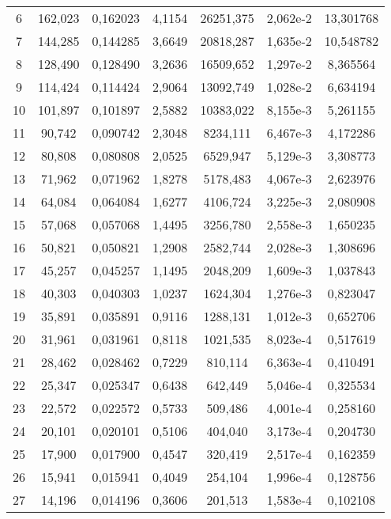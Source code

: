 \begin{longtable}{S[table-format=4.0]S[table-format=3.3]
                  S[table-format=2.6]S[table-format=2.4]
                  S[table-format=6.3]S[table-format=1.3e1]
                  S[table-format=3.6]}
 6 &    162,023 &   0,162023 &     4,1154 &  26251,375 &  2,062e-2 &  13,301768 \\
 7 &    144,285 &   0,144285 &     3,6649 &  20818,287 &  1,635e-2 &  10,548782 \\
 8 &    128,490 &   0,128490 &     3,2636 &  16509,652 &  1,297e-2 &   8,365564 \\
 9 &    114,424 &   0,114424 &     2,9064 &  13092,749 &  1,028e-2 &   6,634194 \\
10 &    101,897 &   0,101897 &     2,5882 &  10383,022 &  8,155e-3 &   5,261155 \\
11 &     90,742 &   0,090742 &     2,3048 &   8234,111 &  6,467e-3 &   4,172286 \\
12 &     80,808 &   0,080808 &     2,0525 &   6529,947 &  5,129e-3 &   3,308773 \\
13 &     71,962 &   0,071962 &     1,8278 &   5178,483 &  4,067e-3 &   2,623976 \\
14 &     64,084 &   0,064084 &     1,6277 &   4106,724 &  3,225e-3 &   2,080908 \\
15 &     57,068 &   0,057068 &     1,4495 &   3256,780 &  2,558e-3 &   1,650235 \\
16 &     50,821 &   0,050821 &     1,2908 &   2582,744 &  2,028e-3 &   1,308696 \\
17 &     45,257 &   0,045257 &     1,1495 &   2048,209 &  1,609e-3 &   1,037843 \\
18 &     40,303 &   0,040303 &     1,0237 &   1624,304 &  1,276e-3 &   0,823047 \\
19 &     35,891 &   0,035891 &     0,9116 &   1288,131 &  1,012e-3 &   0,652706 \\
20 &     31,961 &   0,031961 &     0,8118 &   1021,535 &  8,023e-4 &   0,517619 \\
21 &     28,462 &   0,028462 &     0,7229 &    810,114 &  6,363e-4 &   0,410491 \\
22 &     25,347 &   0,025347 &     0,6438 &    642,449 &  5,046e-4 &   0,325534 \\
23 &     22,572 &   0,022572 &     0,5733 &    509,486 &  4,001e-4 &   0,258160 \\
24 &     20,101 &   0,020101 &     0,5106 &    404,040 &  3,173e-4 &   0,204730 \\
25 &     17,900 &   0,017900 &     0,4547 &    320,419 &  2,517e-4 &   0,162359 \\
26 &     15,941 &   0,015941 &     0,4049 &    254,104 &  1,996e-4 &   0,128756 \\
27 &     14,196 &   0,014196 &     0,3606 &    201,513 &  1,583e-4 &   0,102108 \\

\end{longtable}
